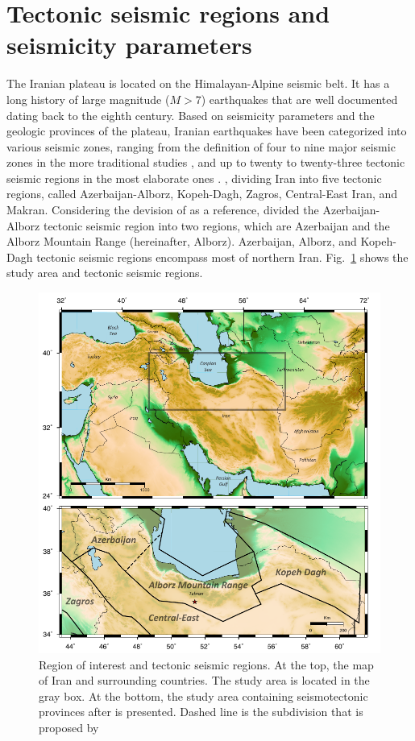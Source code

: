 \section{Tectonic seismic regions and seismicity parameters}
\noindent
The Iranian plateau is located on the Himalayan-Alpine seismic belt. It has a long history of large magnitude ($M>7$) earthquakes that are well documented dating back to the eighth century. Based on seismicity parameters and the geologic provinces of the plateau, Iranian earthquakes have been categorized into various seismic zones, ranging from the definition of four to nine major seismic zones in the more traditional studies \citep[e.g.,][]{Stocklin1968,Takin1972,Berberian1976}, and up to twenty to twenty-three tectonic seismic regions in the most elaborate ones \citep[e.g.,][]{Nowroozi1976,Tavakoli1999}. \citet{Mirzaei1998},  dividing Iran into five tectonic regions, called Azerbaijan-Alborz, Kopeh-Dagh, Zagros, Central-East Iran, and Makran. Considering the devision of  \citet{Mirzaei1998} as a reference,  \citet{Karimiparidari2013}  divided the Azerbaijan-Alborz tectonic seismic region into two regions, which are Azerbaijan and the Alborz Mountain Range (hereinafter, Alborz). Azerbaijan, Alborz, and Kopeh-Dagh tectonic seismic regions encompass most of northern Iran.  Fig.~\ref{fig:study_region} shows the study area and tectonic seismic regions. \\
 
\begin{figure} [ht]
\centering
\includegraphics[scale=1]{figures/pdf/Figure01.pdf} 
\caption{Region of interest and tectonic seismic regions. At the top, the map of Iran and surrounding countries. The study area is located in the gray box. At the bottom, the study area containing seismotectonic provinces after \citet{Mirzaei1998} is presented. Dashed line is the subdivision that is proposed by \citet{Karimiparidari2013}}
\label{fig:study_region}
\end{figure}
  
